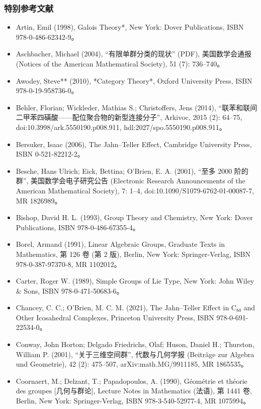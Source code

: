 \subsubsection{特别参考文献} 
\begin{itemize}
\item Artin, Emil (1998), Galois Theory*, New York: Dover Publications, ISBN 978-0-486-62342-9。  
\item Aschbacher, Michael (2004), “有限单群分类的现状” (PDF), 美国数学会通报 (Notices of the American Mathematical Society), 51 (7): 736–740。  
\item Awodey, Steve** (2010), *Category Theory*, Oxford University Press, ISBN 978-0-19-958736-0。  
\item Behler, Florian; Wickleder, Mathias S.; Christoffers, Jens (2014), “联苯和联间二甲苯四磺酸——配位聚合物的新型连接分子”, Arkivoc, 2015 (2): 64–75, doi:10.3998/ark.5550190.p008.911, hdl:2027/spo.5550190.p008.911。  
\item Bersuker, Isaac (2006), The Jahn–Teller Effect, Cambridge University Press, ISBN 0-521-82212-2。  
\item Besche, Hans Ulrich; Eick, Bettina; O'Brien, E. A. (2001), “至多 2000 阶的群”, 美国数学会电子研究公告 (Electronic Research Announcements of the American Mathematical Society), 7: 1–4, doi:10.1090/S1079-6762-01-00087-7, MR 1826989。  
\item Bishop, David H. L. (1993), Group Theory and Chemistry, New York: Dover Publications, ISBN 978-0-486-67355-4。  
\item Borel, Armand (1991), Linear Algebraic Groups, Graduate Texts in Mathematics, 第 126 卷 (第 2 版), Berlin, New York: Springer-Verlag, ISBN 978-0-387-97370-8, MR 1102012。  
\item Carter, Roger W. (1989), Simple Groups of Lie Type, New York: John Wiley & Sons, ISBN 978-0-471-50683-6。  
\item Chancey, C. C.; O'Brien, M. C. M. (2021), The Jahn–Teller Effect in C₆₀ and Other Icosahedral Complexes, Princeton University Press, ISBN 978-0-691-22534-0。  
\item Conway, John Horton; Delgado Friedrichs, Olaf; Huson, Daniel H.; Thurston, William P. (2001), “关于三维空间群”, 代数与几何学报 (Beiträge zur Algebra und Geometrie), 42 (2): 475–507, arXiv:math.MG/9911185, MR 1865535。
\item Coornaert, M.; Delzant, T.; Papadopoulos, A. (1990), Géométrie et théorie des groupes [几何与群论], Lecture Notes in Mathematics (法语), 第 1441 卷, Berlin, New York: Springer-Verlag, ISBN 978-3-540-52977-4, MR 1075994。  

\end{itemize}
